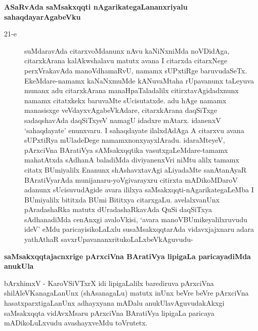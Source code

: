 {\noindent
{\large\bf ASaRvAda saMsakxqqti nAgarikategaLananxriyalu sahaqdayarAgabeVku}}\label{page51a}
\begin{description}
\item[21-e] suMdaravAda citarxvoMdanunx nAvu kaNiNxniMda noVDidAga, citarxkArana kalA\-kwshalavu matutx avana I citarxda citarxNege perxVrakavAda manoVdhamaRvU, namamx sUPxtiRge baruvudaSeTx. EkeMdare-\-namamx kaNaNxmuMde kANuvaMtaha rUpavanunx taLeyuva munanx adu citarxkArana manaHpaTala\-dalilx citirxta\-vAgi\-dadxnunx namamx citatxkekx baruvaMte sUcisutatxde. adu hAge namamx manasisxge veVdayxvAgabeVkAdare, citarxkArana daqSiTxge sadaqshavAda daqSiTxyeV namagU idadxre mAtarx. idanenxV `sahaqda\-yate' enunxvaru. I sahaqdayate ilalx\-dAdAga A citarxvu avana sUPxtiRya mUladeDege namamx\-nonxyayxlAradu. idaraMteyeV, pArxciVna BAratiVya sAMsakxqqtika vasutxgaLeMdare-tamamx maha\-tAtxda sAdhanA baladiMda diviyanenxVri niMtu alilx tamamx citatx BUmiyalilx Enanunx shAshavxtavAgi aLiya\-daMte sanAtanAyaR BAratiVyarAda muni\-janaru-yoVgivarayxru citirxta mADikoMDaroV adanunx sUcisuvudAgide avara ililxya saMsakxqqti-nAgarikategaLeMba I BUmiyalilx bititxda BUmi Bititxya citarxgaLu. avelalxvanUnx pAradashaRka matutx dUradashaRkavAda QuSi daqSiTxya sAdhanadiMda cenAnxgi avaloVkisi, `avara manoVBUmikeyalilxruvudu ideV' eMdu paricayisikoLaLxlu susaMsakxqqtarAda vidavxjajxnaru adara yathAthaR savxrUpavananxritukoLaLxbeVkAguvudu-
\end{description}
{\noindent
{\large\bf saMsakxqqtajacnxrige pArxciVna BAratiVya lipigaLa paricayadiMda anukUla}}
\medskip

\noindent
bArxhimxV - KaroVSiVTxrX idi lipigaLalilx barediruva pArxciVna shilAleVKanagaLanUnx (shAsanagaLu) matutx inUnx beVre beVre pArxciVna hasatxparxtigaLanUnx adhayxyana mADalu anukUlavAguvudakAkxgi saMsakxqqta vidAvxM\-saru pArxciVna BAratiVya lipigaLa paricaya mADikoLuLxvudu avashayxveMdu toVrutetx.

